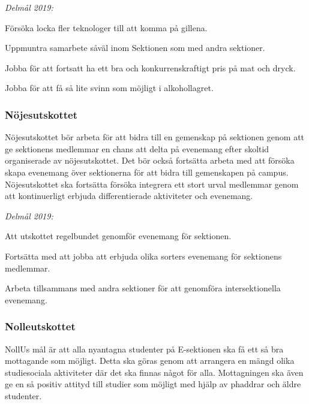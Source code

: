 \documentclass[10pt]{article}
\begin{document}
    \emph{Delmål 2019:}
    \begin{dashlist}
        \item Försöka locka fler teknologer till att komma på gillena. 
        \item Uppmuntra samarbete såväl inom Sektionen som med andra sektioner. 
        \item Jobba för att fortsatt ha ett bra och konkurrenskraftigt pris på mat och dryck. 
        \item Jobba för att få så lite svinn som möjligt i alkohollagret.     
    \end{dashlist}
    
    \subsubsection*{Nöjesutskottet}
    Nöjesutskottet bör arbeta för att bidra till en gemenskap på sektionen genom att ge sektionens medlemmar en chans att delta på evenemang efter skoltid organiserade av nöjesutskottet. Det bör också fortsätta arbeta med att försöka skapa evenemang över sektionerna för att bidra till gemenskapen på campus. Nöjesutskottet ska fortsätta försöka integrera ett stort urval medlemmar genom att kontinuerligt erbjuda differentierade aktiviteter och evenemang.
    
    \emph{Delmål 2019:}
    \begin{dashlist}
        \item Att utskottet regelbundet genomför evenemang för sektionen. 
        \item Fortsätta med att jobba att erbjuda olika sorters evenemang för sektionens medlemmar.
        \item Arbeta tillsammans med andra sektioner för att genomföra intersektionella evenemang. 
    \end{dashlist}
    
    \newpage
    
    \subsubsection*{Nolleutskottet}
    NollUs mål är att alla nyantagna studenter på E-sektionen ska få ett så bra mottagande som möjligt. Detta ska göras genom att arrangera en mängd olika studiesociala aktiviteter där det ska finnas något för alla. Mottagningen ska även ge en så positiv attityd till studier som möjligt med hjälp av phaddrar och äldre studenter.
    
\end{document}
